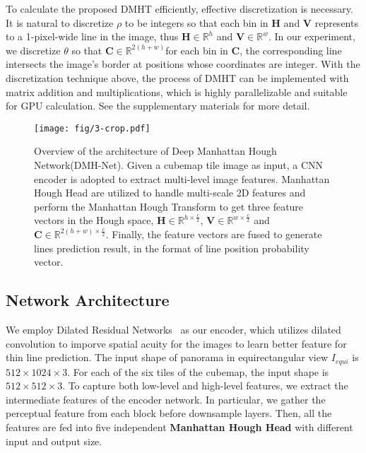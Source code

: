 \documentclass[runningheads]{llncs}
\begin{document}
To calculate the proposed DMHT efficiently, effective discretization is necessary. It is natural to discretize $\rho$ to be integers so that each bin in $\mathbf{H}$ and $\mathbf{V}$ represents to a 1-pixel-wide line in the image, thus $\mathbf{H}\in \mathbb{R}^{h}$ and $\mathbf{V}\in \mathbb{R}^{w}$. In our experiment, we discretize $\theta$ so that $\mathbf{C}\in \mathbb{R}^{2(h+w)}$for each bin in $\mathbf{C}$, the corresponding line intersects the image's border at positions whose coordinates are integer. With the discretization technique above, the process of DMHT can be implemented with matrix addition and multiplications, which is highly parallelizable and suitable for GPU calculation. See the supplementary materials for more detail.

\begin{figure*}[!h]
	\centering
	\texttt{[image: fig/3-crop.pdf]}
	\caption{Overview of the architecture of Deep Manhattan Hough Network(DMH-Net). Given a cubemap tile image as input, a CNN encoder is adopted to extract multi-level image features. Manhattan Hough Head are utilized to handle multi-scale 2D features and perform the Manhattan Hough Transform to get three feature vectors in the Hough space, $\mathbf{H}\in\mathbb{R}^{h\times \frac{c}{2}}$, $\mathbf{V}\in\mathbb{R}^{w\times \frac{c}{2}}$ and $\mathbf{C}\in\mathbb{R}^{2(h+w)\times \frac{c}{2}}$. Finally, the feature vectors are fused to generate lines prediction result, in the format of line position probability vector.
	}
	\label{fig:model} 
\end{figure*}

\subsection{Network Architecture}\label{sec:arch}
We employ Dilated Residual Networks~\cite{yu2017dilated,He_2016_ResNet} as our encoder, which utilizes dilated convolution to imporve spatial acuity for the images to learn better feature for thin line prediction. The input shape of panorama in equirectangular view $I_{equi}$ is $512 \times 1024 \times 3$.
For each of the six tiles of the cubemap, the input shape is $512 \times 512 \times 3$.
To capture both low-level and high-level features, we extract the intermediate features of the encoder network. In particular, we gather the perceptual feature from each block before downsample layers. Then, all the features are fed into five independent \textbf{Manhattan Hough Head} with different input and output size. 
\end{document}
